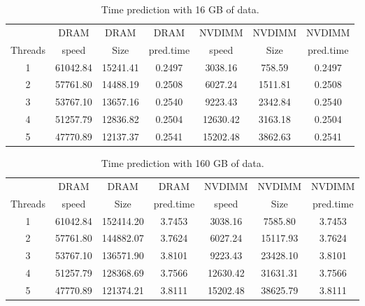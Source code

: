 \documentclass[12pt,a4paper,USenglish]{article}      %
\begin{document}
\begin{table}[!hbtp]
\begin{tabular}{ |c|c|c|c|c|c|c| }
\hline
        & DRAM  & DRAM & DRAM      & NVDIMM & NVDIMM & NVDIMM \\
Threads & speed & Size & pred.time & speed  & Size   & pred.time \\
\hline
1 & 61042.84 & 15241.41 & 0.2497 & 3038.16 & 758.59 & 0.2497 \\
\hline
2 & 57761.80 & 14488.19 & 0.2508 & 6027.24 & 1511.81 & 0.2508 \\
\hline
3 & 53767.10 & 13657.16 & 0.2540 & 9223.43 & 2342.84 & 0.2540 \\
\hline
4 & 51257.79 & 12836.82 & 0.2504 & 12630.42 & 3163.18 & 0.2504 \\
\hline
5 & 47770.89 & 12137.37 & 0.2541 & 15202.48 & 3862.63 & 0.2541 \\
\hline
\end{tabular}
\caption{Time prediction with 16 GB of data.}
\label{tab:Prediction16GB}
\end{table}

\begin{table}[!hbtp]
\begin{tabular}{ |c|c|c|c|c|c|c| }
\hline
        & DRAM  & DRAM & DRAM      & NVDIMM & NVDIMM & NVDIMM \\
Threads & speed & Size & pred.time & speed  & Size   & pred.time \\
\hline
1 & 61042.84 & 152414.20 & 3.7453 & 3038.16 & 7585.80 & 3.7453 \\
\hline
2 & 57761.80 & 144882.07 & 3.7624 & 6027.24 & 15117.93 & 3.7624 \\
\hline
3 & 53767.10 & 136571.90 & 3.8101 & 9223.43 & 23428.10 & 3.8101 \\
\hline
4 & 51257.79 & 128368.69 & 3.7566 & 12630.42 & 31631.31 & 3.7566 \\
\hline
5 & 47770.89 & 121374.21 & 3.8111 & 15202.48 & 38625.79 & 3.8111 \\
\hline
\end{tabular}
\caption{Time prediction with 160 GB of data.}
\label{tab:Prediction160GB}
\end{table}
\end{document}

